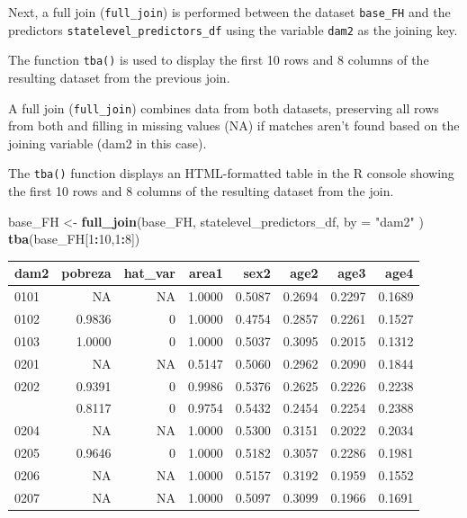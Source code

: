 \documentclass[
  12pt,
]{book}
\newenvironment{Shaded}{\begin{snugshade}}{\end{snugshade}}
\newcommand{\AttributeTok}[1]{\textcolor[rgb]{0.13,0.29,0.53}{#1}}
\newcommand{\DecValTok}[1]{\textcolor[rgb]{0.00,0.00,0.81}{#1}}
\newcommand{\FunctionTok}[1]{\textcolor[rgb]{0.13,0.29,0.53}{\textbf{#1}}}
\newcommand{\NormalTok}[1]{#1}
\newcommand{\OtherTok}[1]{\textcolor[rgb]{0.56,0.35,0.01}{#1}}
\newcommand{\SpecialCharTok}[1]{\textcolor[rgb]{0.81,0.36,0.00}{\textbf{#1}}}
\newcommand{\StringTok}[1]{\textcolor[rgb]{0.31,0.60,0.02}{#1}}
\begin{document}
Next, a full join (\texttt{full\_join}) is performed between the dataset \texttt{base\_FH} and the predictors \texttt{statelevel\_predictors\_df} using the variable \texttt{dam2} as the joining key.

The function \texttt{tba()} is used to display the first 10 rows and 8 columns of the resulting dataset from the previous join.

A full join (\texttt{full\_join}) combines data from both datasets, preserving all rows from both and filling in missing values (NA) if matches aren't found based on the joining variable (dam2 in this case).

The \texttt{tba()} function displays an HTML-formatted table in the R console showing the first 10 rows and 8 columns of the resulting dataset from the join.

\begin{Shaded}
\begin{Highlighting}[]
\NormalTok{base\_FH }\OtherTok{\textless{}{-}} \FunctionTok{full\_join}\NormalTok{(base\_FH, statelevel\_predictors\_df, }\AttributeTok{by =} \StringTok{"dam2"}\NormalTok{ )}
\FunctionTok{tba}\NormalTok{(base\_FH[}\DecValTok{1}\SpecialCharTok{:}\DecValTok{10}\NormalTok{,}\DecValTok{1}\SpecialCharTok{:}\DecValTok{8}\NormalTok{])}
\end{Highlighting}
\end{Shaded}

\begin{table}[H]
\centering
\centering
\begin{tabular}[t]{lrrrrrrr}
\toprule
dam2 & pobreza & hat\_var & area1 & sex2 & age2 & age3 & age4\\
\midrule
0101 & NA & NA & 1.0000 & 0.5087 & 0.2694 & 0.2297 & 0.1689\\
0102 & 0.9836 & 0 & 1.0000 & 0.4754 & 0.2857 & 0.2261 & 0.1527\\
0103 & 1.0000 & 0 & 1.0000 & 0.5037 & 0.3095 & 0.2015 & 0.1312\\
0201 & NA & NA & 0.5147 & 0.5060 & 0.2962 & 0.2090 & 0.1844\\
0202 & 0.9391 & 0 & 0.9986 & 0.5376 & 0.2625 & 0.2226 & 0.2238\\
\addlinespace
0203 & 0.8117 & 0 & 0.9754 & 0.5432 & 0.2454 & 0.2254 & 0.2388\\
0204 & NA & NA & 1.0000 & 0.5300 & 0.3151 & 0.2022 & 0.2034\\
0205 & 0.9646 & 0 & 1.0000 & 0.5182 & 0.3057 & 0.2286 & 0.1981\\
0206 & NA & NA & 1.0000 & 0.5157 & 0.3192 & 0.1959 & 0.1552\\
0207 & NA & NA & 1.0000 & 0.5097 & 0.3099 & 0.1966 & 0.1691\\
\bottomrule
\end{tabular}
\end{table}
\end{document}
